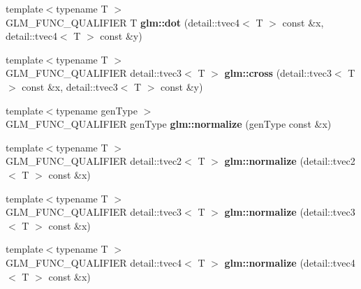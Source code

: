 \begin{DoxyCompactItemize}
\item 
\hypertarget{namespaceglm_af9645b5c6e227c570470967c4e716126}{{\footnotesize template$<$typename T $>$ }\\\-G\-L\-M\-\_\-\-F\-U\-N\-C\-\_\-\-Q\-U\-A\-L\-I\-F\-I\-E\-R \-T {\bfseries glm\-::dot} (detail\-::tvec4$<$ \-T $>$ const \&x, detail\-::tvec4$<$ \-T $>$ const \&y)}\label{namespaceglm_af9645b5c6e227c570470967c4e716126}

\item 
\hypertarget{namespaceglm_a83f3f9d7e3603fbfa78a26e2063bfa02}{{\footnotesize template$<$typename T $>$ }\\\-G\-L\-M\-\_\-\-F\-U\-N\-C\-\_\-\-Q\-U\-A\-L\-I\-F\-I\-E\-R \*
detail\-::tvec3$<$ \-T $>$ {\bfseries glm\-::cross} (detail\-::tvec3$<$ \-T $>$ const \&x, detail\-::tvec3$<$ \-T $>$ const \&y)}\label{namespaceglm_a83f3f9d7e3603fbfa78a26e2063bfa02}

\item 
\hypertarget{namespaceglm_a213a489b64d438c533ea56f4cb2d2426}{{\footnotesize template$<$typename gen\-Type $>$ }\\\-G\-L\-M\-\_\-\-F\-U\-N\-C\-\_\-\-Q\-U\-A\-L\-I\-F\-I\-E\-R gen\-Type {\bfseries glm\-::normalize} (gen\-Type const \&x)}\label{namespaceglm_a213a489b64d438c533ea56f4cb2d2426}

\item 
\hypertarget{namespaceglm_a062d04793a570e36f1d76fb798b5d271}{{\footnotesize template$<$typename T $>$ }\\\-G\-L\-M\-\_\-\-F\-U\-N\-C\-\_\-\-Q\-U\-A\-L\-I\-F\-I\-E\-R \*
detail\-::tvec2$<$ \-T $>$ {\bfseries glm\-::normalize} (detail\-::tvec2$<$ \-T $>$ const \&x)}\label{namespaceglm_a062d04793a570e36f1d76fb798b5d271}

\item 
\hypertarget{namespaceglm_a1f6e6247e73865728a13fa80190e394d}{{\footnotesize template$<$typename T $>$ }\\\-G\-L\-M\-\_\-\-F\-U\-N\-C\-\_\-\-Q\-U\-A\-L\-I\-F\-I\-E\-R \*
detail\-::tvec3$<$ \-T $>$ {\bfseries glm\-::normalize} (detail\-::tvec3$<$ \-T $>$ const \&x)}\label{namespaceglm_a1f6e6247e73865728a13fa80190e394d}

\item 
\hypertarget{namespaceglm_abab14dd2c2e10451bd4fa85f2e291bfe}{{\footnotesize template$<$typename T $>$ }\\\-G\-L\-M\-\_\-\-F\-U\-N\-C\-\_\-\-Q\-U\-A\-L\-I\-F\-I\-E\-R \*
detail\-::tvec4$<$ \-T $>$ {\bfseries glm\-::normalize} (detail\-::tvec4$<$ \-T $>$ const \&x)}\label{namespaceglm_abab14dd2c2e10451bd4fa85f2e291bfe}


\end{DoxyCompactItemize}
